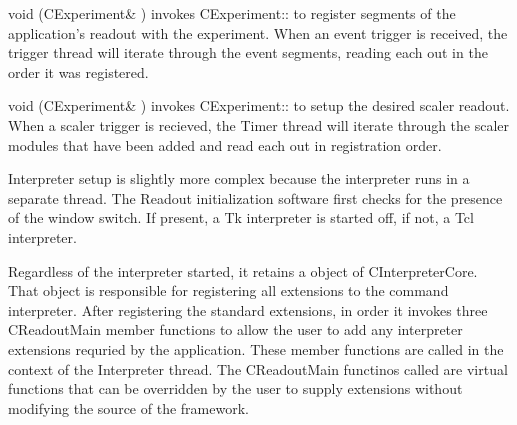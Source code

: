       \begin{description}
	 \item{void (CExperiment\& )}
	     invokes 
	    CExperiment:: to register segments
	    of the application's readout with the experiment.  When an event
	    trigger is received, the trigger thread will iterate through the event
	    segments, reading each out in the order it was registered.
	 \item{void (CExperiment\& )}
	  invokes CExperiment::
	 to setup the desired scaler readout.  When a scaler trigger is
	 recieved, the Timer thread will iterate through the scaler modules
	 that have been added and read each out in registration order.
      \end{description}
      
      Interpreter setup is slightly more complex because the interpreter runs
      in a separate thread.  The Readout initialization software first
      checks for the presence of the {\dash\dash}window switch.  If present,
      a Tk interpreter is started off, if not, a Tcl interpreter.  
      
      Regardless of the interpreter started, it retains a object of 
      CInterpreterCore.  That object is responsible for registering all
      extensions to the command interpreter.  After registering the standard
      extensions, in order it invokes three CReadoutMain member functions
      to allow the user to add any interpreter extensions requried by the
      application.  These member functions are called in the context of the
      Interpreter thread.  The CReadoutMain functinos called are virtual 
      functions that can be overridden by the user to supply extensions
      without modifying the source of the framework.
      
